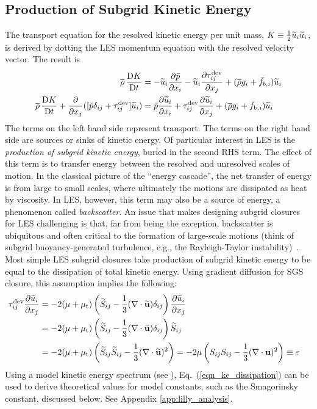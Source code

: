 \subsection{Production of Subgrid Kinetic Energy}

The transport equation for the resolved kinetic energy per unit mass, $K\equiv \mbox{$\frac{1}{2}$} \widetilde{u}_i\widetilde{u}_i$, is derived by dotting the LES momentum equation with the resolved velocity vector.  The result is
\begin{align}
\label{eqn_LES_KE}
\overline{\rho} \,\frac{\mathrm{D} K}{\mathrm{D} t} &= -\widetilde{u}_i\frac{\partial \bar{p}}{\partial x_i} - \widetilde{u}_i\frac{\partial \tau_{ij}^{\rm dev}}{\partial x_j} + (\overline{\rho} g_i + \bar{f}_{b,i}) \widetilde{u}_i \notag \\
\overline{\rho} \,\frac{\mathrm{D} K}{\mathrm{D} t} + \frac{\partial}{\partial x_j} ([\bar{p}\delta_{ij} + \tau_{ij}^{\rm dev}]\widetilde{u}_i) &=  \bar{p} \frac{\partial \widetilde{u}_i}{\partial x_i} + \tau_{ij}^{\rm dev}\frac{\partial \widetilde{u}_i}{\partial x_j} + (\overline{\rho} g_i + \bar{f}_{{\rm b},i}) \widetilde{u}_i
\end{align}
The terms on the left hand side represent transport.  The terms on the right hand side are sources or sinks of kinetic energy.  Of particular interest in LES is the \emph{production of subgrid kinetic energy}, buried in the second RHS term.  The effect of this term is to transfer energy between the resolved and unresolved scales of motion.  In the classical picture of the ``energy cascade'', the net transfer of energy is from large to small scales, where ultimately the motions are dissipated as heat by viscosity.  In LES, however, this term may also be a source of energy, a phenomenon called \emph{backscatter}.  An issue that makes designing subgrid closures for LES challenging is that, far from being the exception, backscatter is ubiquitous and often critical to the formation of large-scale motions (think of subgrid buoyancy-generated turbulence, e.g., the Rayleigh-Taylor instability)~\cite{Piomelli:1991}.
Most simple LES subgrid closures take production of subgrid kinetic energy to be equal to the dissipation of total kinetic energy.  Using gradient diffusion for SGS closure, this assumption implies the following:
\begin{align}
\label{eqn_ke_dissipation}
\tau_{ij}^{\rm dev}\frac{\partial \widetilde{u}_i}{\partial x_j} &= - 2 (\mu + \mu_{\rm t}) \left(\widetilde{S}_{ij} - \frac{1}{3}(\nabla\cdot \widetilde{\mathbf{u}}) \delta_{ij} \right) \frac{\partial \widetilde{u}_i}{\partial x_j} && \notag\\
&= - 2 (\mu + \mu_{\rm t}) \left(\widetilde{S}_{ij} - \frac{1}{3}(\nabla\cdot \widetilde{\mathbf{u}}) \delta_{ij} \right) \widetilde{S}_{ij} && \notag \\
&= - 2 (\mu + \mu_{\rm t}) \left(\widetilde{S}_{ij}\widetilde{S}_{ij} - \frac{1}{3}(\nabla\cdot \widetilde{\mathbf{u}})^2 \right) = -2\mu \left(S_{ij}S_{ij} - \frac{1}{3}(\nabla\cdot \mathbf{u})^2 \right) \equiv \varepsilon
\end{align}
Using a model kinetic energy spectrum (see \cite{Pope:2000}), Eq.~(\ref{eqn_ke_dissipation}) can be used to derive theoretical values for model constants, such as the Smagorinsky constant, discussed below.  See Appendix \ref{app:lilly_analysis}.

